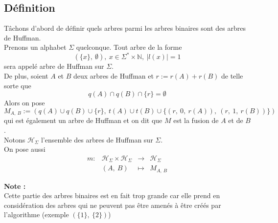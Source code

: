 \documentclass[a4paper, 12pt]{article}
\begin{document}
\subsection{Définition}
Tâchons d'abord de définir quels arbres parmi les arbres binaires sont des arbres de Huffman. \\
Prenons un alphabet $\Sigma$ quelconque. Tout arbre de la forme
$$
(\{x\},\ \emptyset),\ x \in \Sigma^*\times \mathbb{N},\ |l(x)| = 1
$$
sera appelé arbre de Huffman sur $\Sigma$. \\
De plus, soient $A$ et $B$ deux arbres de Huffman et $r := r(A)+r(B)$ de telle sorte que
$$
q(A) \cap q(B) \cap \{r\} = \emptyset
$$
Alors on pose
$$
M_{A,\ B} := (q(A) \cup q(B) \cup \{r\},\ t(A)\cup t(B)\cup \{(r,\ 0,\ r(A)),\ (r,\ 1,\ r(B))\})
$$
qui est également un arbre de Huffman et on dit que $M$ est la fusion de $A$ et de $
B$. \\
Notons $\mathcal{H}_\Sigma$ l'ensemble des arbres de Huffman sur $\Sigma$. \\
On pose aussi
$$
\begin{matrix}
m: &\mathcal{H}_\Sigma\times \mathcal{H}_\Sigma &\rightarrow &\mathcal{H}_\Sigma \\
&(A,\ B) &\mapsto &M_{A,\ B}
\end{matrix}
$$

\textbf{Note :} \\
Cette partie des arbres binaires est en fait trop grande car elle prend en considération des arbres qui ne peuvent pas être amenés à être créés par l'algorithme (exemple $(\{1\},\ \{2\})$)
\end{document}
